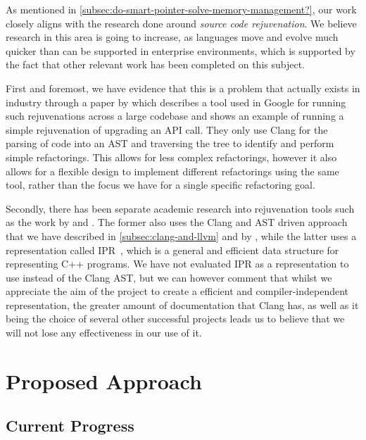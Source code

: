 \documentclass{proposal}
\begin{document}
    As mentioned in \autoref{subsec:do-smart-pointer-solve-memory-management?}, our work closely aligns with the research done around \emph{source code rejuvenation}.
    We believe research in this area is going to increase, as languages move and evolve much quicker than can be supported in enterprise environments, which is supported by the fact that other relevant work has been completed on this subject.

    First and foremost, we have evidence that this is a problem that actually exists in industry through a paper by \citet{Wright2013} which describes a tool used in Google for running such rejuvenations across a large codebase and shows an example of running a simple rejuvenation of upgrading an API call.
    They only use Clang for the parsing of code into an AST and traversing the tree to identify and perform simple refactorings.
    This allows for less complex refactorings, however it also allows for a flexible design to implement different refactorings using the same tool, rather than the focus we have for a single specific refactoring goal.

    Secondly, there has been separate academic research into rejuvenation tools such as the work by \citet{Huck2016} and \citet{Kumar2012}.
    The former also uses the Clang and AST driven approach that we have described in \autoref{subsec:clang-and-llvm} and by \citet{Wright2013}, while the latter uses a representation called IPR~\cite{Dos2011}, which is a general and efficient data structure for representing C++ programs.
    We have not evaluated IPR as a representation to use instead of the Clang AST, but we can however comment that whilst we appreciate the aim of the project to create a efficient and compiler-independent representation, the greater amount of documentation that Clang has, as well as it being the choice of several other successful projects leads us to believe that we will not lose any effectiveness in our use of it.




    \section{Proposed Approach}\label{sec:proposed-approach}

    \subsection{Current Progress}\label{subsec:current-progress}
\end{document}
